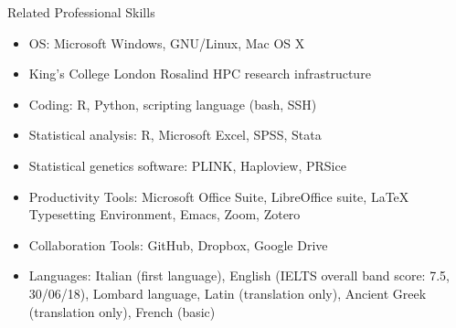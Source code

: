 \documentclass{resume2} %
\begin{document}




\begin{rSection}{Related Professional Skills}
\begin{multicols}{2}[]
  \begin{itemize}
    \item OS: \@ Microsoft Windows, GNU/Linux, Mac OS X
    \item King's College London Rosalind HPC research infrastructure
    \item Coding: \@ R, Python, scripting language (bash, SSH)
    \item Statistical analysis: \@ R, Microsoft Excel, SPSS, Stata
    \item Statistical genetics software: \@ PLINK, Haploview, PRSice
	\item Productivity Tools: \@ Microsoft Office Suite, LibreOffice suite, \LaTeX \hspace{.1mm} Typesetting Environment, Emacs, Zoom, Zotero
    \item Collaboration Tools: \@ GitHub, Dropbox, Google Drive
    \item Languages: \@ Italian (first language), English (IELTS overall band score: 7.5, 30/06/18), Lombard language, Latin (translation only), Ancient Greek (translation only), French (basic)
\end{itemize}
\end{multicols}
\end{rSection}

\end{document}
